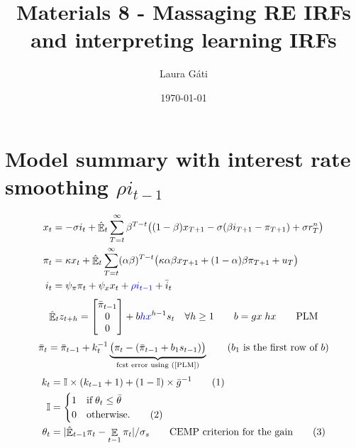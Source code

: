 \documentclass[11pt]{article}
\renewcommand{\[}{\begin{equation}}
\renewcommand{\]}{\end{equation}}
\DeclareMathOperator{\E}{\mathbb{E}}
\newcommand\numberthis{\addtocounter{equation}{1}\tag{\theequation}} %
\begin{document}
\linespread{1.0}

\title{Materials 8 - Massaging RE IRFs and interpreting learning IRFs}
\author{Laura G\'ati} 
\date{\today}
\maketitle


\tableofcontents




\newpage
\section{Model summary with interest rate smoothing $\rho i_{t-1}$}
\begin{align}
x_t &=  -\sigma i_t +\hat{\E}_t \sum_{T=t}^{\infty} \beta^{T-t }\big( (1-\beta)x_{T+1} - \sigma(\beta i_{T+1} - \pi_{T+1}) +\sigma r_T^n \big)  \label{prestons18}  \\
\pi_t &= \kappa x_t +\hat{\E}_t \sum_{T=t}^{\infty} (\alpha\beta)^{T-t }\big( \kappa \alpha \beta x_{T+1} + (1-\alpha)\beta \pi_{T+1} + u_T\big) \label{prestons19}  \\
i_t &= \psi_{\pi}\pi_t + \psi_{x} x_t  + \textcolor{blue}{\rho i_{t-1}} + \bar{i}_t \label{TR}
\end{align}
\begin{equation}
\hat{\E}_t z_{t+h} =  \begin{bmatrix}\bar{\pi}_{t-1} \\ 0 \\ 0 \end{bmatrix}+ b\textcolor{blue}{hx}^{h-1}s_t  \quad \forall h\geq 1 \quad \quad b = gx \; hx \quad \quad \text{PLM} \label{PLM}
\end{equation}
\begin{equation}
\bar{\pi}_{t} = \bar{\pi}_{t-1} +k_t^{-1}\underbrace{\big(\pi_{t} -(\bar{\pi}_{t-1}+b_1s_{t-1}) \big)}_{\text{fcst error using (\ref{PLM})} } \quad \quad  \text{($b_1$ is the first row of $b$)}
\end{equation}
 \begin{align*}
k_t & = \mathbb{I}\times(k_{t-1}+1) + (1-\mathbb{I}) \times \bar{g}^{-1}  \label{gain} \numberthis\\
\mathbb{I} & = \begin{cases} 1 \quad \text{if} \; \theta_t \leq \bar{\theta}  \\ 0 \quad \text{otherwise.}\numberthis
\end{cases} \\
\theta_t & = |\hat{\E}_{t-1}\pi_t - \E_{t-1}\pi_t| / \sigma_s \quad \quad \text{CEMP criterion for the gain}\label{criterion}\numberthis
\end{align*}
\end{document}
